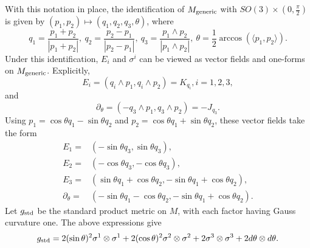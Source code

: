 \documentclass[11pt]{amsart}
\theoremstyle{definition}
\begin{document}
With this notation in place, the identification of $M_{\text{\rm generic}}$ with $SO(3)\times (0,\frac{\pi}{2})$ is given by $(p_1,p_2)\mapsto (q_1,q_2,q_3,\theta)$, where
\begin{equation}\label{identify.s2xs2.SO(3)}
q_1=\frac{p_1+p_2}{|p_1+p_2|},\ q_2=\frac{p_2-p_1}{|p_2-p_1|},\ q_3=\frac{p_1\wedge p_2}{|p_1\wedge p_2|},\ \theta=\frac{1}{2}\arccos(\langle p_1,p_2\rangle).
\end{equation}
Under this identification, $E_i$ and $\sigma^i$ can be viewed as vector fields and one-forms on $M_{\text{\rm generic}}$.
Explicitly,
\[
E_i=(q_i\wedge p_1, q_i\wedge p_2)=K_{q_i}, i=1,2,3,
\]
and
\[
\partial_\theta=(-q_3\wedge p_1,q_3\wedge p_2)=-J_{q_3}.
\]
Using $p_1=\cos\theta q_1-\sin\theta q_2$ and $p_2=\cos\theta q_1+\sin\theta q_2$, these vector fields take the form
\begin{align*}
E_1=& (-\sin\theta q_3, \sin\theta q_3),\\
E_2=&(-\cos\theta q_3, -\cos\theta q_3),\\
E_3=& (\sin\theta q_1+\cos\theta q_2, -\sin\theta q_1+\cos\theta q_2),\\
\partial_\theta=& (-\sin\theta q_1-\cos\theta q_2,-\sin\theta q_1+\cos\theta q_2).
\end{align*}
Let $g_{\textup{std}}$ be the standard product metric on $M$, with each factor having Gauss curvature one.
The above expressions give
\[
g_{\textup{std}}=2(\sin\theta)^2 \sigma^1\otimes \sigma^1+2(\cos\theta)^2 \sigma^2\otimes \sigma^2+2 \sigma^3\otimes \sigma^3+2 d\theta\otimes d\theta.
\]
\end{document}
